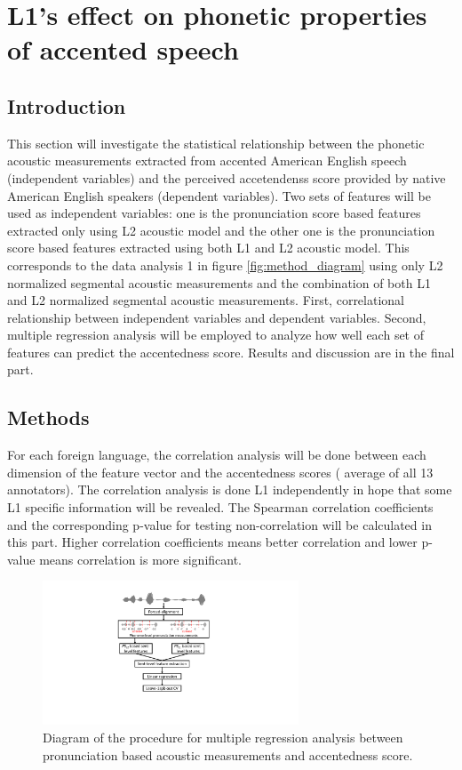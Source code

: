 \chapter{L1's effect on phonetic properties of accented speech}
\label{l1_seg}

\section{Introduction}

This section will investigate the statistical relationship between the phonetic acoustic measurements extracted from accented American English speech (independent variables) and the perceived accetendenss score provided by native American English speakers (dependent variables). Two sets of features will be used as independent variables: one is the pronunciation score based features extracted only using L2 acoustic model and the other one is the pronunciation score based features extracted using both L1 and L2 acoustic model. This corresponds to the data analysis 1 in figure \ref{fig:method_diagram} using only L2 normalized segmental acoustic measurements and the combination of  both L1 and L2 normalized segmental acoustic measurements. First, correlational relationship between independent variables and dependent variables. Second, multiple regression analysis will be employed to analyze how well each set of features can predict the accentedness score. Results and discussion are in the final part.

\section{Methods}


For each foreign language, the correlation analysis will be done between each dimension of the feature vector and the accentedness scores ( average of all 13 annotators). The correlation analysis is done L1 independently in hope that some L1 specific information will be revealed. The Spearman correlation coefficients and the corresponding p-value for testing non-correlation will be calculated in this part. Higher correlation coefficients means better correlation and lower p-value means correlation is more significant.

\begin{figure}[t]
        \begin{minipage}[t]{1\linewidth}
        \centering
            \includegraphics[width=3.0in]{figures/L1_seg_diagram.pdf}
        \end{minipage}%
        \caption{Diagram of the procedure for multiple regression analysis between pronunciation based acoustic measurements and accentedness score.}
        \centering
        \label{fig:l1_seg_diagram}
     \end{figure}

